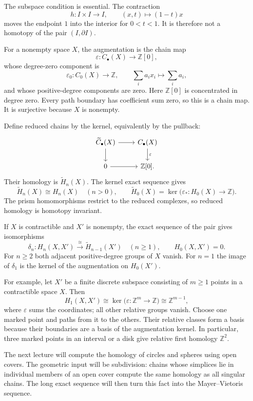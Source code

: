 \documentclass[11pt]{article}
\newcommand{\mapdef}[5]{#1:#2\longrightarrow #3,\qquad #4\longmapsto #5}
\begin{document}
The subspace condition is essential. The contraction
\[
\mapdef{h}{I\times I}{I}{(x,t)}{(1-t)x}
\]
moves the endpoint $1$ into the interior for $0<t<1$. It is therefore not a homotopy of the pair $(I,\partial I)$.

For a nonempty space $X$, the augmentation is the chain map
\[
\varepsilon:C_\bullet(X)\longrightarrow\mathbb Z[0],
\]
whose degree-zero component is
\[
\mapdef{\varepsilon_0}{C_0(X)}{\mathbb Z}{\sum_i a_i x_i}{\sum_i a_i},
\]
and whose positive-degree components are zero. Here $\mathbb Z[0]$ is concentrated in degree zero. Every path boundary has coefficient sum zero, so this is a chain map. It is surjective because $X$ is nonempty.

Define reduced chains by the kernel, equivalently by the pullback:
\[
\begin{tikzcd}
\widetilde C_\bullet(X)\arrow[r]\arrow[d]&C_\bullet(X)\arrow[d,"\varepsilon"]\\
0\arrow[r]&\mathbb Z[0].
\end{tikzcd}
\]
Their homology is $\widetilde H_n(X)$. The kernel exact sequence gives
\[
\widetilde H_n(X)\cong H_n(X)\quad(n>0),\qquad
\widetilde H_0(X)=\ker\bigl(\varepsilon_*:H_0(X)\longrightarrow\mathbb Z\bigr).
\]
The prism homomorphisms restrict to the reduced complexes, so reduced homology is homotopy invariant.

If $X$ is contractible and $X'$ is nonempty, the exact sequence of the pair gives isomorphisms
\[
\delta_n:H_n(X,X')\xrightarrow{\ \cong\ }\widetilde H_{n-1}(X')\quad(n\ge1),
\qquad H_0(X,X')=0.
\]
For $n\ge2$ both adjacent positive-degree groups of $X$ vanish. For $n=1$ the image of $\delta_1$ is the kernel of the augmentation on $H_0(X')$.

For example, let $X'$ be a finite discrete subspace consisting of $m\ge1$ points in a contractible space $X$. Then
\[
H_1(X,X')\cong\ker\bigl(\varepsilon:\mathbb Z^m\longrightarrow\mathbb Z\bigr)
\cong\mathbb Z^{m-1},
\]
where $\varepsilon$ sums the coordinates; all other relative groups vanish. Choose one marked point and paths from it to the others. Their relative classes form a basis because their boundaries are a basis of the augmentation kernel. In particular, three marked points in an interval or a disk give relative first homology $\mathbb Z^2$.

The next lecture will compute the homology of circles and spheres using open covers. The geometric input will be subdivision: chains whose simplices lie in individual members of an open cover compute the same homology as all singular chains. The long exact sequence will then turn this fact into the Mayer--Vietoris sequence.
\end{document}
